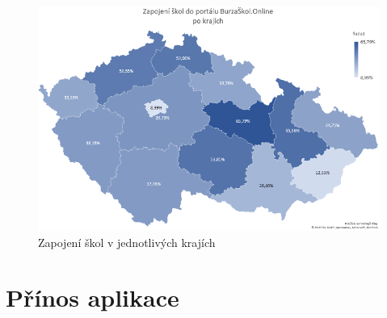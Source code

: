 \begin{figure}[h]
\centering
\includegraphics[width=\textwidth]{img/kraje-zapojeni.png}
\caption{Zapojení škol v jednotlivých krajích}
\label{fig:kraje-zapojeni}
\end{figure}


\section{Přínos aplikace}


